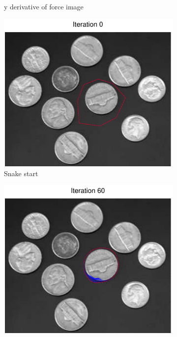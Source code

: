 \documentclass[11pt,a4paper]{article}
\begin{document}
\begin{figure}[H]
\begin{subfigure}[t]{0.24\textwidth}
        \caption{y derivative of force image}
        \label{fig:coins_log_fy}
    \end{subfigure}
    \begin{subfigure}[t]{0.24\textwidth}
        \includegraphics[width=\textwidth]{src/images/coins_log_0.pdf}
        \caption{Snake start}
        \label{fig:coins_log_0}
    \end{subfigure}
    \begin{subfigure}[t]{0.24\textwidth}
        \includegraphics[width=\textwidth]{src/images/coins_log_60.pdf}

\end{subfigure}
\end{figure}
\end{document}
